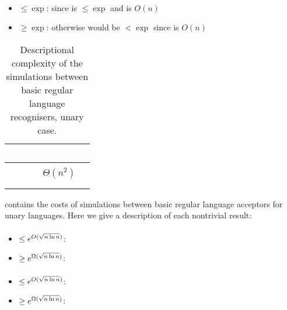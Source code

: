 \paragraph{\ODLA{}\tto\TDFA}
\begin{itemize}
	\item $\le\exp$: since \hyperref[cost:1DLAto1DFA]{\ODLA{}\tto\ODFA} is $\le\exp$ and \ODFA{}\tto\TDFA is $O(n)$
	\item $\ge\exp$: otherwise \hyperref[cost:1DLAto2NFA]{\ODLA{}\tto\TNFA} would be $<\exp$ since \TDFA{}\tto\TNFA is $O(n)$
\end{itemize}


\begin{table}
	\centering
	\renewcommand{\arraystretch}{1.2}
	\begin{tabular}{|l|l|l|p{4.3em}|l|}
		\hline
		~     & \ODFA           & \ONFA           & \TDFA                                            & \TNFA  \\ \hline
		\ODFA & \cY             & \Ctriv          & \Ctriv                                           & \Ctriv \\ \hline
		\ONFA & \rbt{$\CsubEq$} & \cY             & \cR $\Theta(n^2)$                                & \Ctriv \\ \hline
		\TDFA & \rbt{$\CsubEq$} & \rbt{$\CsubEq$} & \cY                                              & \Ctriv \\ \hline
		\TNFA & \rbt{$\CsubEq$} & \rbt{$\CsubEq$} & \cR \rbt[.4]{$\le\Csubln$} \rbt[.3]{$\ge\Cpoly$} & \cY    \\ \hline
	\end{tabular}
	\caption{Descriptional complexity of the simulations between basic regular language recognisers, unary case.}
	\label{tab:sims-core-unary}
\end{table}

 contains the costs of simulations between basic regular language acceptors for unary languages.
Here we give a description of each nontrivial result:

\paragraph{\ONFA{}\tto\ODFA}
\begin{itemize}
	\item $\le e^{O(\sqrt{n\ln n})}$: \cite{Chr86}
	\item $\ge e^{\Omega(\sqrt{n\ln n})}$: \cite{Chr86}
\end{itemize}
\paragraph{\TDFA{}\tto\ODFA}\label{cost:2DFAto1DFAu}
\begin{itemize}
	\item $\le e^{O(\sqrt{n\ln n})}$: \cite{Chr86}
	\item $\ge e^{\Omega(\sqrt{n\ln n})}$: \cite{Chr86}
\end{itemize}
